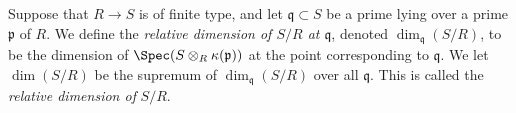 \begin{definition}
\label{definition-relative-dimension}
Suppose that $R \to S$ is of finite type, and let
$\mathfrak q \subset S$ be a prime lying over a prime
$\mathfrak p$ of $R$.
We define the {\it relative dimension
of $S/R$ at $\mathfrak q$}, denoted
$\dim_{\mathfrak q}(S/R)$, to be the dimension
of $\Spec(S \otimes_R \kappa(\mathfrak p))$
at the point corresponding to $\mathfrak q$. We let
$\dim(S/R)$ be the supremum of $\dim_{\mathfrak q}(S/R)$
over all $\mathfrak q$. This is called the
{\it relative dimension of} $S/R$.
\end{definition}
